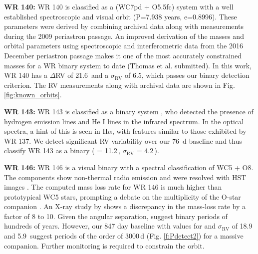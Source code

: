 
\textbf{WR 140:} WR 140 is classified as a (WC7pd + O5.5fc) system with a well established spectroscopic \citep{2011Fahed} and visual \citep[interferometric;][]{2011Monnier} orbit (P=7.938 years, e=0.8996). These parameters were derived by combining archival data along with measurements during the 2009 periastron passage. An improved derivation of the masses and orbital parameters using spectroscopic and interferometric data from the 2016 December periastron passage makes it one of the most accurately constrained masses for a WR binary system to date (Thomas et al. submitted). In this work, WR 140 has a $\Delta$RV of 21.6\kms\, and a $\sigma_\textrm{RV}$ of 6.5\kms, which passes our binary detection criterion. The RV measurements along with archival data are shown in Fig. \ref{fig:known_orbits}.


\textbf{WR 143:} WR 143 is classified as a binary system \citep[WC4 + Be;][]{2006VarricattAshok}, who detected the presence of hydrogen emission lines and He I lines in the infrared spectrum. In the optical spectra, a hint of this is seen in H$\alpha$, with features similar to those exhibited by WR 137. We detect significant RV variability over our 76~d baseline and thus classify WR 143 as a binary (\DelRV{} = 11.2\,\kms{}, $\sigma_\textrm{RV}$ = 4.2\,\kms{}).


\textbf{WR 146:} WR 146 is a visual binary with a spectral classification of WC5 + O8. The components show non-thermal radio emission \citep{1996Dougherty} and were resolved with HST images \citep{1998Niemela}. The computed mass loss rate for WR 146 is much higher than prototypical WC5 stars, prompting a debate on the multiplicity of the O-star companion \citep{2000Dougherty}. An X-ray study by \citet{2017Zhekov} shows a discrepancy in the mass-loss rate by a factor of 8 to 10. Given the angular separation, \citet{1998Niemela} suggest binary periods of hundreds of years. However, our 847 day baseline with values for \DelRV{} and $\sigma_\textrm{RV}$ of 18.9 and 5.9\,\kms{} suggest periods of the order of 3000\,d (Fig. \ref{f:Pdetect2}) for a massive companion. Further monitoring is required to constrain the orbit. 

